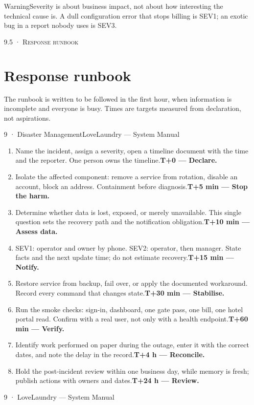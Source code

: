 \documentclass[11pt,a4paper,oneside]{book}
\begin{document}
\begin{notebox}WarningSeverity is about business impact, not about how interesting the technical cause is. A dull configuration error that stops billing is SEV1; an exotic bug in a report nobody uses is SEV3.\end{notebox}
\textsc{\small\color{crimson}9.5 · Response runbook}\par\medskip
\section*{Response runbook}
The runbook is written to be followed in the first hour, when information is incomplete and everyone is busy. Times are targets measured from declaration, not aspirations.

9 · Disaster ManagementLoveLaundry — System Manual

\begin{enumerate}
\item Name the incident, assign a severity, open a timeline document with the time and the reporter. One person owns the timeline.\textbf{T+0 — Declare.}
\item Isolate the affected component: remove a service from rotation, disable an account, block an address. Containment before diagnosis.\textbf{T+5 min — Stop the harm.}
\item Determine whether data is lost, exposed, or merely unavailable. This single question sets the recovery path and the notification obligation.\textbf{T+10 min — Assess data.}
\item SEV1: operator and owner by phone. SEV2: operator, then manager. State facts and the next update time; do not estimate recovery.\textbf{T+15 min — Notify.}
\item Restore service from backup, fail over, or apply the documented workaround. Record every command that changes state.\textbf{T+30 min — Stabilise.}
\item Run the smoke checks: sign-in, dashboard, one gate pass, one bill, one hotel portal read. Confirm with a real user, not only with a health endpoint.\textbf{T+60 min — Verify.}
\item Identify work performed on paper during the outage, enter it with the correct dates, and note the delay in the record.\textbf{T+4 h — Reconcile.}
\item Hold the post-incident review within one business day, while memory is fresh; publish actions with owners and dates.\textbf{T+24 h — Review.}
\end{enumerate}
9 · LoveLaundry — System Manual
\end{document}
